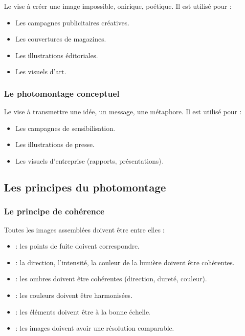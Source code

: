 Le  vise à créer une image impossible, onirique, poétique. Il est utilisé pour :

\begin{itemize}
    \item Les campagnes publicitaires créatives.
    \item Les couvertures de magazines.
    \item Les illustrations éditoriales.
    \item Les visuels d'art.
\end{itemize}

\subsubsection{Le photomontage conceptuel}

Le  vise à transmettre une idée, un message, une métaphore. Il est utilisé pour :

\begin{itemize}
    \item Les campagnes de sensibilisation.
    \item Les illustrations de presse.
    \item Les visuels d'entreprise (rapports, présentations).
\end{itemize}

\subsection{Les principes du photomontage}

\subsubsection{Le principe de cohérence}

Toutes les images assemblées doivent être  entre elles :

\begin{itemize}
    \item {} : les points de fuite doivent correspondre.
    \item {} : la direction, l'intensité, la couleur de la lumière doivent être cohérentes.
    \item {} : les ombres doivent être cohérentes (direction, dureté, couleur).
    \item {} : les couleurs doivent être harmonisées.
    \item {} : les éléments doivent être à la bonne échelle.
    \item {} : les images doivent avoir une résolution comparable.
\end{itemize}

